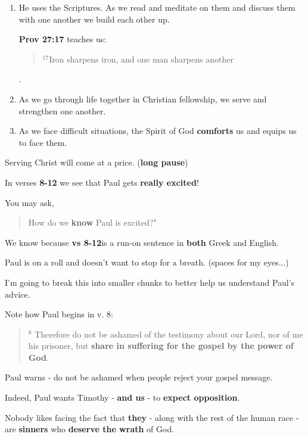 \documentclass[12pt]{article} %
\newcommand{\superscript}[1]{\ensuremath{^{\textrm{#1}}}}
\begin{document}
\begin{enumerate}

\item He uses the Scriptures. As we read and meditate on them and discuss
them with one another we build each other up.

\textbf{  Prov 27:17} teaches us:

\begin{quote}
\superscript{17}Iron sharpens iron, and one man sharpens another
\end{quote}  . 

\item As we go through life together in Christian fellowship,
we serve and strengthen one another.

\item As we face difficult situations, the Spirit of God \textbf{comforts}
us and {equips us to face them}. 


\end{enumerate}

Serving Christ will come at a price.   (\textbf{long pause})

In verses \textbf{8-12} we see that Paul gets \textbf{really excited}!

You may ask,

\begin{quote}
How do we \textbf{know} Paul is excited?"
\end{quote}

We know because \textbf{vs 8-12}is a run-on sentence in \textbf{both}
Greek and English.

Paul is on a roll and doesn't want to stop for a breath.     
(spaces for my eyes...)

I'm going to break this into smaller chunks to better help us understand
Paul's advice.

Note how Paul begins in v. 8:

\begin{quote}
\superscript{8} Therefore do not be ashamed of the testimony about our
Lord, nor of me his prisoner, but
\textbf{share in suffering for the gospel by the power of God}.
\end{quote}

Paul warns - do not be ashamed when people reject your gospel message.

Indeed, Paul wants Timothy - \textbf{and us} - to \textbf{expect opposition}.

Nobody likes facing the fact that \textbf{they}
- along with the rest of the human race -
are \textbf{sinners} who \textbf{deserve the wrath} of God.
\end{document}
